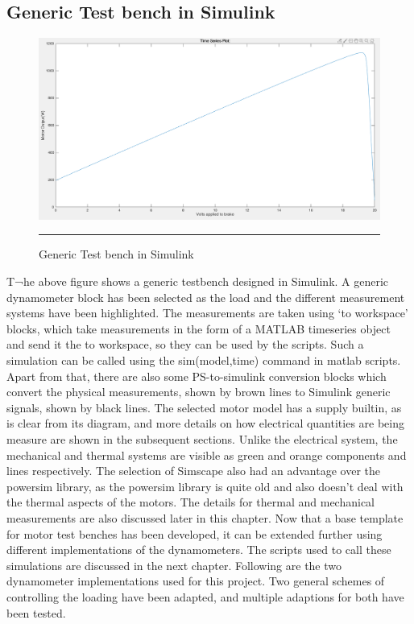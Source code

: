 \subsection{Generic Test bench in Simulink}
\begin{figure}[htbp]
	\centering
		\includegraphics[width = 4.5in]{./Figures/MS/fig322.png}
		\rule{35em}{0.5pt}
	\caption{Generic Test bench in Simulink}
	\label{fig:Generic Test bench in Simulink}
\end{figure}
T¬he above figure shows a generic testbench designed in Simulink. A generic dynamometer block has been selected as the load and the different measurement systems have been highlighted. The measurements are taken using ‘to workspace’ blocks, which take measurements in the form of a MATLAB timeseries object and send it the to workspace, so they can be used by the scripts. Such a simulation can be called using the sim(model,time) command in matlab scripts. Apart from that, there are also some PS-to-simulink conversion blocks which convert the physical measurements, shown by brown lines to Simulink generic signals, shown by black lines. The selected motor model has a supply builtin, as is clear from its diagram, and more details on how electrical quantities are being measure are shown in the subsequent sections. Unlike the electrical system, the mechanical and thermal systems are visible as green and orange components and lines respectively. The selection of Simscape also had an advantage over the powersim library, as the powersim library is quite old and also doesn’t deal with the thermal aspects of the motors. The details for thermal and mechanical measurements are also discussed later in this chapter. Now that a base template for motor test benches has been developed, it can be extended further using different implementations of the dynamometers. The scripts used to call these simulations are discussed in the next chapter. Following are the two dynamometer implementations used for this project. Two general schemes of controlling the loading have been adapted, and multiple adaptions for both have been tested.

